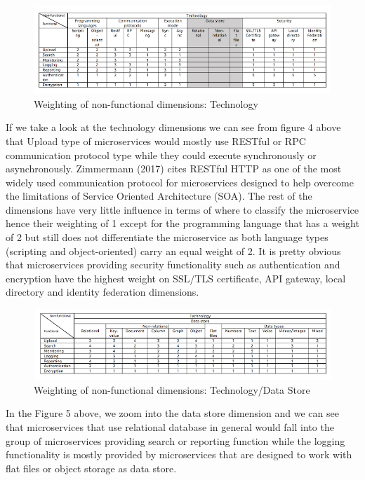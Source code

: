 \documentclass{article}
\begin{document}
\begin{figure}[h!]
\includegraphics{table6.png}
\caption{Weighting of non-functional dimensions: Technology}
\end{figure}

If we take a look at the technology dimensions we can see from figure 4 above that Upload type of microservices would mostly use RESTful or RPC communication protocol type while they could execute synchronously or asynchronously. Zimmermann (2017) cites RESTful HTTP as one of the most widely used communication protocol for microservices designed to help overcome the limitations of Service Oriented Architecture (SOA). The rest of the dimensions have very little influence in terms of where to classify the microservice hence their weighting of 1 except for the programming language that has a weight of 2 but still does not differentiate the microservice as both language types (scripting and object-oriented) carry an equal weight of 2. It is pretty obvious that microservices providing security functionality such as authentication and encryption have the highest weight on SSL/TLS certificate, API gateway, local directory and identity federation dimensions.

\begin{figure}[h!]
\includegraphics{table7.png}
\caption{Weighting of non-functional dimensions: Technology/Data Store}
\end{figure}

In the Figure 5 above, we zoom into the data store dimension and we can see that microservices that use relational database in general would fall into the group of microservices providing search or reporting function while the logging functionality is mostly provided by microservices that are designed to work with flat files or object storage as data store. 
\end{document}

